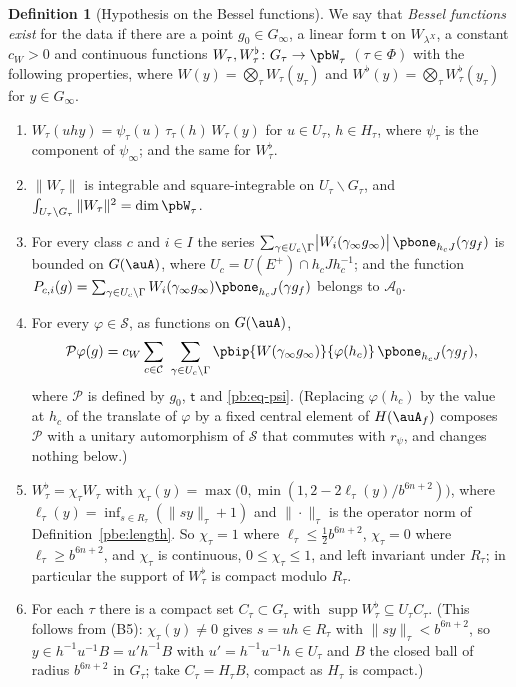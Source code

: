\documentclass[10pt]{amsart}
\theoremstyle{definition}
\newtheorem{definition}[theorem]{Definition}
\theoremstyle{remark}
\providecommand{\auAz}{\mathcal A_0}
\providecommand{\auP}{\mathcal P}
\providecommand{\auPl}{\Phi}
\providecommand{\auS}{\mathcal S}
\providecommand{\pbrpsi}{r_\psi}
\begin{document}
\begin{definition}[Hypothesis on the Bessel functions]\label{pb:bessel}
We say that \emph{Bessel functions exist} for the data if there are a point $g_0\in G_\infty$, a
linear form $\mathsf t$ on $W_{\lambda^X}$, a constant $c_W>0$ and continuous functions
$W_\tau,W_\tau^\flat\colon G_\tau\to\pbW_\tau$ $(\tau\in\auPl)$ with the following properties, where
$W(y)=\bigotimes_\tau W_\tau(y_\tau)$ and $W^\flat(y)=\bigotimes_\tau W^\flat_\tau(y_\tau)$ for
$y\in G_\infty$.
\begin{enumerate}
\item[(B1)] $W_\tau(uhy)=\psi_\tau(u)\,\tau_\tau(h)\,W_\tau(y)$ for $u\in U_\tau$, $h\in H_\tau$,
where $\psi_\tau$ is the component of $\psi_\infty$; and the same for $W_\tau^\flat$.
\item[(B2)] $\|W_\tau\|$ is integrable and square-integrable on $U_\tau\backslash G_\tau$, and
$\int_{U_\tau\backslash G_\tau}\|W_\tau\|^2=\dim\pbW_\tau$.
\item[(B3)] For every class $c$ and $i\in I$ the series $\sum_{\gamma\in U_c\backslash\Gamma}
\bigl|W_i(\gamma_\infty g_\infty)\bigr|\,\pbone_{h_cJ}(\gamma g_f)$ is bounded on $G(\auA)$, where
$U_c=U(E^+)\cap h_cJh_c^{-1}$; and the function $P_{c,i}(g)=\sum_{\gamma\in U_c\backslash\Gamma}W_i(
\gamma_\infty g_\infty)\pbone_{h_cJ}(\gamma g_f)$ belongs to $\auAz$.
\item[(B4)] For every $\varphi\in\auS$, as functions on $G(\auA)$,
\[
\auP\varphi(g)=c_W\sum_{c\in\mathcal C}\ \sum_{\gamma\in U_c\backslash\Gamma}\pbip{W(\gamma_\infty
g_\infty)}{\varphi(h_c)}\,\pbone_{h_cJ}(\gamma g_f),
\]
where $\auP$ is defined by $g_0$, $\mathsf t$ and \eqref{pb:eq-psi}. (Replacing $\varphi(h_c)$ by
the value at $h_c$ of the translate of $\varphi$ by a fixed central element of $H(\auA_f)$ composes
$\auP$ with a unitary automorphism of $\auS$ that commutes with $\pbrpsi$, and changes nothing below.)
\item[(B5)] $W^\flat_\tau=\chi_\tau W_\tau$ with
$\chi_\tau(y)=\max\bigl(0,\min(1,2-2\ell_\tau(y)/b^{6n+2})\bigr)$, where
$\ell_\tau(y)=\inf_{s\in R_\tau}(\|sy\|_\tau+1)$ and $\|\cdot\|_\tau$ is the operator norm of
Definition~\ref{pbe:length}. So $\chi_\tau=1$ where $\ell_\tau\le\frac12b^{6n+2}$, $\chi_\tau=0$
where $\ell_\tau\ge b^{6n+2}$, and $\chi_\tau$ is continuous, $0\le\chi_\tau\le1$, and left
invariant under $R_\tau$; in particular the support of $W^\flat_\tau$ is compact modulo $R_\tau$.
\item[(B5$'$)] For each $\tau$ there is a compact set $C_\tau\subset G_\tau$ with
$\operatorname{supp}W^\flat_\tau\subseteq U_\tau C_\tau$. (This follows from (B5): $\chi_\tau(y)\ne0$ gives
$s=uh\in R_\tau$ with $\|sy\|_\tau<b^{6n+2}$, so $y\in h^{-1}u^{-1}B=u'h^{-1}B$ with $u'=h^{-1}u^{-1}h\in
U_\tau$ and $B$ the closed ball of radius $b^{6n+2}$ in $G_\tau$; take $C_\tau=H_\tau B$, compact as
$H_\tau$ is compact.)
\end{enumerate}
\end{definition}
\end{document}
